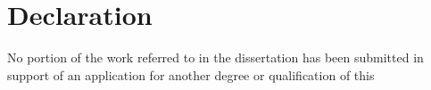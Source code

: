 \documentclass{report}
\begin{document}
	\chapter*{Declaration}
	
	No portion of the work referred to in the dissertation has been submitted in support of an application for another degree or qualification of this
\end{document}
